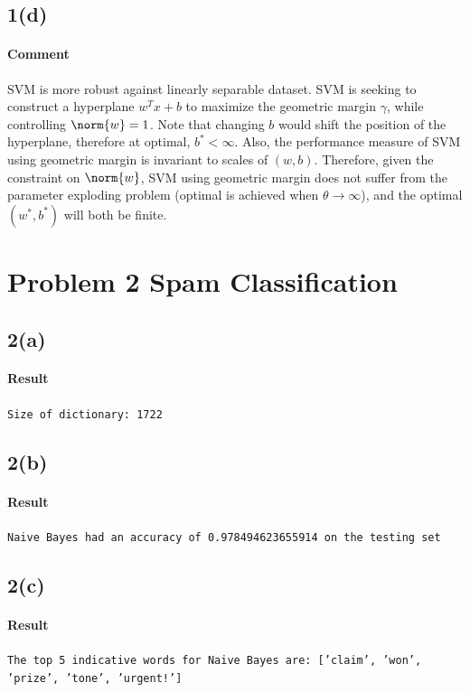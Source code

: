 \documentclass[11pt]{article}
\begin{document}
	\newpage
	\subsection{1(d)}
	\paragraph{Comment} SVM is more robust against linearly separable dataset. SVM is seeking to construct a hyperplane $w^T x + b$ to maximize the geometric margin $\gamma$, while controlling $\norm{w} = 1$. Note that changing $b$ would shift the position of the hyperplane, therefore at optimal, $b^* < \infty$. Also, the performance measure of SVM using geometric margin is invariant to scales of $(w, b)$. Therefore, given the constraint on $\norm{w}$, SVM using geometric margin does not suffer from the parameter exploding problem (optimal is achieved when $\theta \to \infty$), and the optimal $(w^*, b^*)$ will both be finite.
	
	\newpage
	\section{Problem 2 Spam Classification}
	\subsection{2(a)}
	\paragraph{Result} \texttt{Size of dictionary: 1722}
	
	\newpage
	\subsection{2(b)}
	\paragraph{Result} \texttt{Naive Bayes had an accuracy of 0.978494623655914 on the testing set}
	
	\newpage
	\subsection{2(c)}
	\paragraph{Result} \texttt{The top 5 indicative words for Naive Bayes are:  ['claim', 'won', 'prize', 'tone', 'urgent!']}
	
\end{document}
